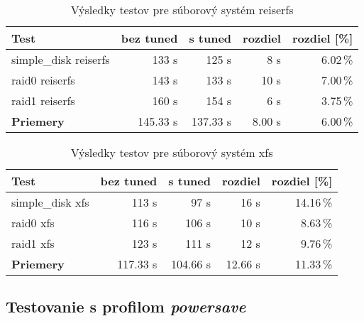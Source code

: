 \begin{table}[H]
\begin{center}
\begin{tabular}{|l|r|r|r|r|}
    \hline
    \textbf{Test} & \textbf{bez tuned} & \textbf{s tuned} & \textbf{rozdiel} & \textbf{rozdiel [\%]} \\ \hline
    simple\_disk reiserfs & 133 s & 125 s & 8 s & 6.02\,\% \\
    \hline
    raid0 reiserfs & 143 s & 133 s & 10 s & 7.00\,\% \\
    \hline
    raid1 reiserfs & 160 s & 154 s & 6 s & 3.75\,\% \\
    \hline
    \textbf{Priemery} & 145.33 s & 137.33 s & 8.00 s & 6.00\,\% \\
    \hline
\end{tabular}
\caption{Výsledky testov pre súborový systém reiserfs}
\label{tab:results-reiserfs}
\end{center}
\end{table}

\begin{table}[H]
\begin{center}
\begin{tabular}{|l|r|r|r|r|}
    \hline
    \textbf{Test} & \textbf{bez tuned} & \textbf{s tuned} & \textbf{rozdiel} & \textbf{rozdiel [\%]} \\ \hline
    simple\_disk xfs & 113 s & 97 s & 16 s & 14.16\,\% \\
    \hline
    raid0 xfs & 116 s & 106 s & 10 s & 8.63\,\% \\
    \hline
    raid1 xfs & 123 s & 111 s & 12 s & 9.76\,\% \\
    \hline
    \textbf{Priemery} & 117.33 s & 104.66 s & 12.66 s & 11.33\,\% \\
    \hline
\end{tabular}
\caption{Výsledky testov pre súborový systém xfs}
\label{tab:results-xfs}
\end{center}
\end{table}

\subsection{Testovanie s profilom \emph{powersave}}

